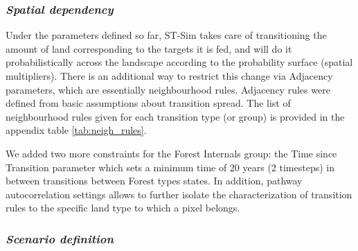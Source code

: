 \subsubsection*{\textit{Spatial dependency}}

Under the parameters defined so far, ST-Sim takes care of transitioning the amount of land corresponding to the targets it is fed, and will do it probabilistically across the landscape according to the probability surface (spatial multipliers). There is an additional way to restrict this change via Adjacency parameters, which are essentially neighbourhood rules. Adjacency rules were  defined from basic assumptions about transition spread. The list of neighbourhood rules given for each transition type (or group) is provided in the appendix table \ref{tab:neigh_rules}.

We added two more constraints for the Forest Internals group: the Time since Transition parameter which sets a minimum time of 20 years (2 timesteps) in between transitions between Forest  types states. In addition, pathway autocorrelation settings allows to further isolate the characterization of transition rules to the specific land type to which a pixel belongs.\\

\subsubsection*{\textit{Scenario definition}}

